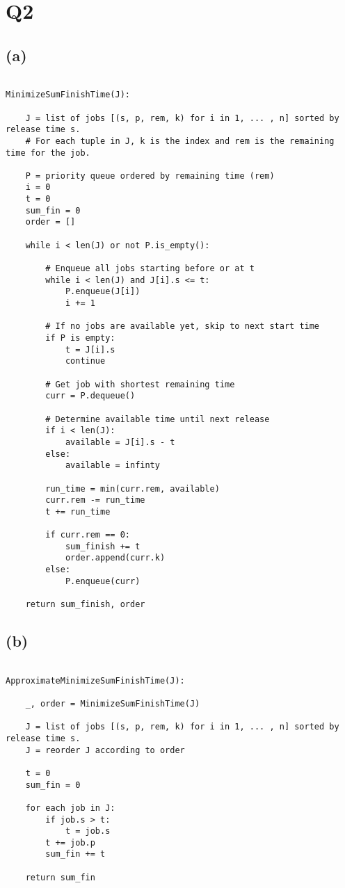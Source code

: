 \section*{Q2}

\subsection*{(a)}

\begin{verbatim}

MinimizeSumFinishTime(J):

    J = list of jobs [(s, p, rem, k) for i in 1, ... , n] sorted by release time s.
    # For each tuple in J, k is the index and rem is the remaining time for the job.
    
    P = priority queue ordered by remaining time (rem)
    i = 0                
    t = 0                
    sum_fin = 0
    order = []

    while i < len(J) or not P.is_empty():
        
        # Enqueue all jobs starting before or at t
        while i < len(J) and J[i].s <= t:
            P.enqueue(J[i])
            i += 1
    
        # If no jobs are available yet, skip to next start time
        if P is empty:
            t = J[i].s
            continue
    
        # Get job with shortest remaining time
        curr = P.dequeue()
    
        # Determine available time until next release
        if i < len(J):
            available = J[i].s - t
        else:
            available = infinty
    
        run_time = min(curr.rem, available)
        curr.rem -= run_time
        t += run_time
    
        if curr.rem == 0:
            sum_finish += t
            order.append(curr.k)
        else:
            P.enqueue(curr)
    
    return sum_finish, order
    \end{verbatim}

\newpage

\subsection*{(b)}

\begin{verbatim}

ApproximateMinimizeSumFinishTime(J):

    _, order = MinimizeSumFinishTime(J)

    J = list of jobs [(s, p, rem, k) for i in 1, ... , n] sorted by release time s.
    J = reorder J according to order

    t = 0
    sum_fin = 0

    for each job in J:
        if job.s > t:
            t = job.s
        t += job.p
        sum_fin += t

    return sum_fin
\end{verbatim}


